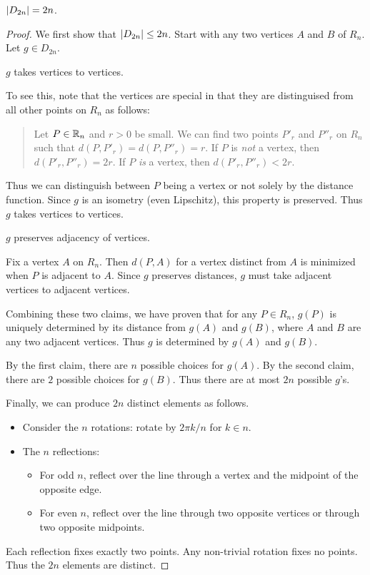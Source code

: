 \begin{proposition}
    $\lvert D_{2n}\rvert = 2n$.
\end{proposition}
\begin{proof}
    We first show that $\lvert D_{2n}\rvert \le 2n$.
    Start with any two vertices $A$ and $B$ of $R_n$.
    Let $g \in D_{2n}$.

    \begin{claim}
        $g$ takes vertices to vertices.
    \end{claim}
    To see this, note that the vertices are special in that they are
    distinguised from all other points on $R_n$ as follows:
    \begin{quotation}
        Let $P \in \mathbb{R}_n$ and $r > 0$ be small.
        We can find two points $P'_r$ and $P''_r$ on $R_n$ such that
        $d(P, P'_r) = d(P, P''_r) = r$.
        If $P$ is \emph{not} a vertex, then $d(P'_r, P''_r) = 2r$.
        If $P$ \emph{is} a vertex, then $d(P'_r, P''_r) < 2r$.
    \end{quotation}
    Thus we can distinguish between $P$ being a vertex or not solely by the
    distance function.
    Since $g$ is an isometry (even Lipschitz), this property is preserved.
    Thus $g$ takes vertices to vertices.

    \begin{claim}
        $g$ preserves adjacency of vertices.
    \end{claim}
    Fix a vertex $A$ on $R_n$.
    Then $d(P, A)$ for a vertex distinct from $A$ is minimized when $P$
    is adjacent to $A$.
    Since $g$ preserves distances, $g$ must take adjacent vertices to
    adjacent vertices.

    Combining these two claims, we have proven that for any $P \in R_n$,
    $g(P)$ is uniquely determined by its distance from $g(A)$ and $g(B)$,
    where $A$ and $B$ are any two adjacent vertices.
    Thus $g$ is determined by $g(A)$ and $g(B)$.

    By the first claim, there are $n$ possible choices for $g(A)$.
    By the second claim, there are $2$ possible choices for $g(B)$.
    Thus there are at most $2n$ possible $g$'s.

    Finally, we can produce $2n$ distinct elements as follows.
    \begin{itemize}
        \item Consider the $n$ rotations: rotate by $2\pi k / n$ for
            $k \in n$.
        \item The $n$ reflections:
        \begin{itemize}
            \item For odd $n$, reflect over the line through a vertex and
                the midpoint of the opposite edge.
            \item For even $n$, reflect over the line through two opposite
                vertices or through two opposite midpoints.
        \end{itemize}
    \end{itemize}
    Each reflection fixes exactly two points.
    Any non-trivial rotation fixes no points.
    Thus the $2n$ elements are distinct.
\end{proof}

